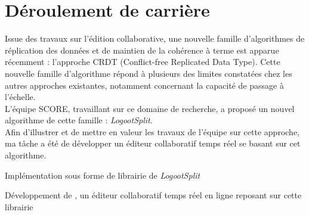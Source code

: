 \documentclass[]{deedy-resume-openfont}
\begin{document}
%
%

%
%

%
%


\section{Déroulement de carrière}

\sectionsep

\sectionsep

\sectionsep

\hfill\begin{minipage}{\dimexpr\textwidth-0.5cm}
Issue des travaux sur l'édition collaborative, une nouvelle famille d'algorithmes de réplication des données
et de maintien de la cohérence à terme est apparue récemment : l'approche CRDT (Conflict-free Replicated Data Type).
Cette nouvelle famille d'algorithme répond à plusieurs des limites constatées chez les autres approches existantes,
notamment concernant la capacité de passage à l'échelle.
\\
L'équipe SCORE, travaillant sur ce domaine de recherche, a proposé un nouvel algorithme de cette famille : \emph{LogootSplit}.
\\
Afin d'illustrer et de mettre en valeur les travaux de l'équipe sur cette approche,
ma tâche a été de développer un éditeur collaboratif temps réel se basant sur cet algorithme.
\begin{tightemize}
\item Implémentation sous forme de librairie de \emph{LogootSplit}
\item Développement de \href{https://www.coedit.re}{}, un éditeur collaboratif temps réel en ligne reposant sur cette librairie
\end{tightemize}
\sectionsep\xdef\tpd{\the\prevdepth}
\end{minipage}
\end{document}

